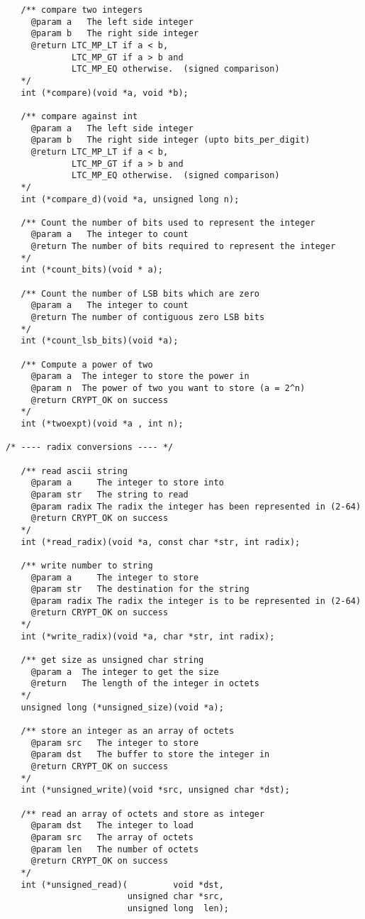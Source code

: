 \documentclass[synpaper]{book}
\begin{document}
\begin{small}
\begin{verbatim}
   /** compare two integers
     @param a   The left side integer
     @param b   The right side integer
     @return LTC_MP_LT if a < b,
             LTC_MP_GT if a > b and
             LTC_MP_EQ otherwise.  (signed comparison)
   */
   int (*compare)(void *a, void *b);

   /** compare against int
     @param a   The left side integer
     @param b   The right side integer (upto bits_per_digit)
     @return LTC_MP_LT if a < b,
             LTC_MP_GT if a > b and
             LTC_MP_EQ otherwise.  (signed comparison)
   */
   int (*compare_d)(void *a, unsigned long n);

   /** Count the number of bits used to represent the integer
     @param a   The integer to count
     @return The number of bits required to represent the integer
   */
   int (*count_bits)(void * a);

   /** Count the number of LSB bits which are zero
     @param a   The integer to count
     @return The number of contiguous zero LSB bits
   */
   int (*count_lsb_bits)(void *a);

   /** Compute a power of two
     @param a  The integer to store the power in
     @param n  The power of two you want to store (a = 2^n)
     @return CRYPT_OK on success
   */
   int (*twoexpt)(void *a , int n);

/* ---- radix conversions ---- */

   /** read ascii string
     @param a     The integer to store into
     @param str   The string to read
     @param radix The radix the integer has been represented in (2-64)
     @return CRYPT_OK on success
   */
   int (*read_radix)(void *a, const char *str, int radix);

   /** write number to string
     @param a     The integer to store
     @param str   The destination for the string
     @param radix The radix the integer is to be represented in (2-64)
     @return CRYPT_OK on success
   */
   int (*write_radix)(void *a, char *str, int radix);

   /** get size as unsigned char string
     @param a  The integer to get the size
     @return   The length of the integer in octets
   */
   unsigned long (*unsigned_size)(void *a);

   /** store an integer as an array of octets
     @param src   The integer to store
     @param dst   The buffer to store the integer in
     @return CRYPT_OK on success
   */
   int (*unsigned_write)(void *src, unsigned char *dst);

   /** read an array of octets and store as integer
     @param dst   The integer to load
     @param src   The array of octets
     @param len   The number of octets
     @return CRYPT_OK on success
   */
   int (*unsigned_read)(         void *dst,
                        unsigned char *src,
                        unsigned long  len);


\end{verbatim}
\end{small}
\end{document}
